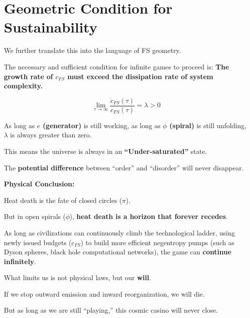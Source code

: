 \section{Geometric Condition for Sustainability}

We further translate this into the language of FS geometry.

The necessary and sufficient condition for infinite games to proceed is: \textbf{The growth rate of $c_{FS}$ must exceed the dissipation rate of system complexity.}

\[\lim_{\tau \to \infty} \frac{\dot{c}_{FS}(\tau)}{c_{FS}(\tau)} = \lambda > 0\]

As long as \textbf{$e$ (generator)} is still working, as long as \textbf{$\phi$ (spiral)} is still unfolding, $\lambda$ is always greater than zero.

This means the universe is always in an \textbf{``Under-saturated''} state.

The \textbf{potential difference} between ``order'' and ``disorder'' will never disappear.

\textbf{Physical Conclusion:}

Heat death is the fate of closed circles ($\pi$).

But in open spirals ($\phi$), \textbf{heat death is a horizon that forever recedes}.

As long as civilizations can continuously climb the technological ladder, using newly issued budgets ($c_{FS}$) to build more efficient negentropy pumps (such as Dyson spheres, black hole computational networks), the game can \textbf{continue infinitely}.

What limits us is not physical laws, but our \textbf{will}.

If we stop outward emission and inward reorganization, we will die.

But as long as we are still ``playing,'' this cosmic casino will never close.


